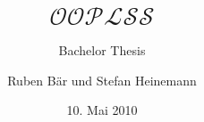 \documentclass[t,xcolor=svgnames]{beamer}
\title[Object-Oriented Language with Subtyping and Subclassing]{$\mathcal{OOPLSS}$}
\subtitle{Bachelor Thesis}
\institute[BFH-TI]{\textbf{Bern University of Applied Sciences}\\
Engineering and Information Technology}
\author[Ruben Bär und Stefan Heinemann]{Ruben Bär und Stefan Heinemann}
\date{10. Mai 2010}
\begin{document}
  \mylstset
  
\end{document}
